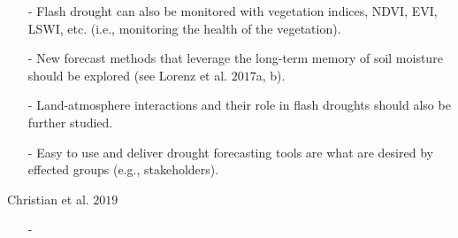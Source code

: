 \documentclass[12pt, letterpaper]{article}
\begin{document}
\begin{itemize}
        \item[-] Flash drought can also be monitored with vegetation indices, NDVI, EVI, LSWI, etc. 
                 (i.e., monitoring the health of the vegetation).
        \item[-] New forecast methods that leverage the long-term memory of soil moisture should be
                 explored (see Lorenz et al. $2017$a, b).
        \item[-] Land-atmosphere interactions and their role in flash droughts should also be further
                 studied.
        \item[-] Easy to use and deliver drought forecasting tools are what are desired by effected 
                 groups (e.g., stakeholders).
	\end{itemize}
    \par
    Christian et al. $2019$
    \begin{itemize}
    	\item[-]
    \end{itemize}
\end{document}
